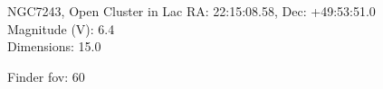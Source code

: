 \begin{block}{NGC7243, Open Cluster in Lac}
    RA: 22:15:08.58, Dec: +49:53:51.0 \\ 
    Magnitude (V): 6.4 \\ 
    Dimensions: 15.0 

    Finder fov: 60 
\end{block}